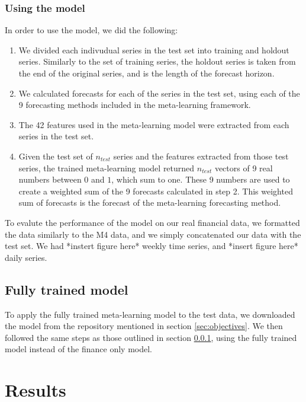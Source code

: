 \documentclass[a4paper,12pt]{article}
\theoremstyle{definition}
\begin{document}
\subsubsection{Using the model}\label{sec:using}
In order to use the model, we did the following:
\begin{enumerate}
	\item We divided each indivudual series in the test set into training and holdout series. Similarly to the set of training series, the holdout series is taken from the end of the original series, and is the length of the forecast horizon.
	\item We calculated forecasts for each of the series in the test set, using each of the 9 forecasting methods included in the meta-learning framework.
	\item The 42 features used in the meta-learning model were extracted from each series in the test set.
	\item Given the test set of $n_{test}$ series and the features extracted from those test series, the trained meta-learning model returned $n_{test}$ vectors of 9 real numbers between $0$ and $1$, which sum to one. These 9 numbers are used to create a weighted sum of the 9 forecasts calculated in step 2. This weighted sum of forecasts is the forecast of the meta-learning forecasting method.
\end{enumerate}
To evalute the performance of the model on our real financial data, we formatted the data similarly to the M4 data, and we simply concatenated our data with the test set. We had *instert figure here* weekly time series, and *insert figure here* daily series.

\subsection{Fully trained model}
To apply the fully trained meta-learning model to the test data, we downloaded the model from the repository mentioned in section \ref{sec:objectives}. We then followed the same steps as those outlined in section \ref{sec:using}, using the fully trained model instead of the finance only model.

\section{Results}
\end{document}

